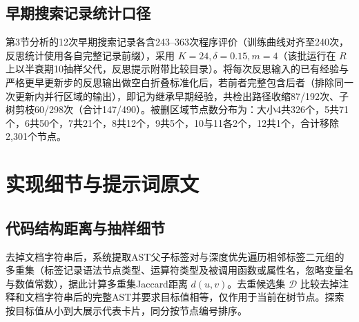 \documentclass{article}
\begin{document}
\subsection{早期搜索记录统计口径}\label{ux65e9ux671fux641cux7d22ux8bb0ux5f55ux7edfux8ba1ux53e3ux5f84}

第3节分析的12次早期搜索记录各含243--363次程序评价（训练曲线对齐至240次，反思统计使用各自完整记录前缀），采用 \(K=24,\delta=0.15,m=4\)（该批运行在 \(R\) 上以半衰期10抽样父代，反思提示附带比较目录）。将每次反思输入的已有经验与严格更早更新步的反思输出做空白折叠标准化后，若前者完整包含后者（排除同一次更新内并行区域的输出），即记为继承早期经验，共检出路径收缩87/192次、子树剪枝60/298次（合计147/490）。被删区域节点数分布为：大小4共326个，5共71个，6共50个，7共21个，8共12个，9共5个，10与11各2个，12共1个，合计移除2,301个节点。

\section{实现细节与提示词原文}\label{ux5b9eux73b0ux7ec6ux8282ux4e0eux63d0ux793aux8bcdux539fux6587}

\subsection{代码结构距离与抽样细节}\label{ux4ee3ux7801ux7ed3ux6784ux8dddux79bbux4e0eux62bdux6837ux7ec6ux8282}

去掉文档字符串后，系统提取AST父子标签对与深度优先遍历相邻标签二元组的多重集（标签记录语法节点类型、运算符类型及被调用函数或属性名，忽略变量名与数值常数），据此计算多重集Jaccard距离 \(d(u,v)\)。去重候选集 \(\mathcal D\) 比较去掉注释和文档字符串后的完整AST并要求目标值相等，仅作用于当前在树节点。探索按目标值从小到大展示代表卡片，同分按节点编号排序。
\end{document}
